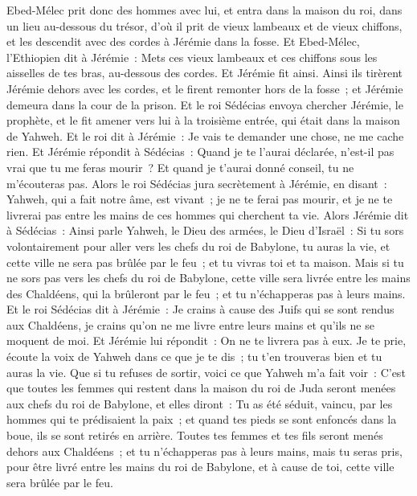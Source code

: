 \begin{multicols}{2}
Ebed-Mélec prit donc des hommes avec lui, et entra dans la maison du roi, dans un lieu au-dessous du trésor, d'où il prit de vieux lambeaux et de vieux chiffons, et les descendit avec des cordes à Jérémie dans la fosse.
Et Ebed-Mélec, l'Ethiopien dit à Jérémie~: Mets ces vieux lambeaux et ces chiffons sous les aisselles de tes bras, au-dessous des cordes. Et Jérémie fit ainsi.
Ainsi ils tirèrent Jérémie dehors avec les cordes, et le firent remonter hors de la fosse~; et Jérémie demeura dans la cour de la prison.
Et le roi Sédécias envoya chercher Jérémie, le prophète, et le fit amener vers lui à la troisième entrée, qui était dans la maison de Yahweh. Et le roi dit à Jérémie~: Je vais te demander une chose, ne me cache rien.
Et Jérémie répondit à Sédécias~: Quand je te l'aurai déclarée, n'est-il pas vrai que tu me feras mourir~? Et quand je t'aurai donné conseil, tu ne m'écouteras pas.
Alors le roi Sédécias jura secrètement à Jérémie, en disant~: Yahweh, qui a fait notre âme, est vivant~; je ne te ferai pas mourir, et je ne te livrerai pas entre les mains de ces hommes qui cherchent ta vie.
Alors Jérémie dit à Sédécias~: Ainsi parle Yahweh, le Dieu des armées, le Dieu d'Israël~: Si tu sors volontairement pour aller vers les chefs du roi de Babylone, tu auras la vie, et cette ville ne sera pas brûlée par le feu~; et tu vivras toi et ta maison.
Mais si tu ne sors pas vers les chefs du roi de Babylone, cette ville sera livrée entre les mains des Chaldéens, qui la brûleront par le feu~; et tu n'échapperas pas à leurs mains.
Et le roi Sédécias dit à Jérémie~: Je crains à cause des Juifs qui se sont rendus aux Chaldéens, je crains qu'on ne me livre entre leurs mains et qu'ils ne se moquent de moi.
Et Jérémie lui répondit~: On ne te livrera pas à eux. Je te prie, écoute la voix de Yahweh dans ce que je te dis~; tu t'en trouveras bien et tu auras la vie.
Que si tu refuses de sortir, voici ce que Yahweh m'a fait voir~:
C'est que toutes les femmes qui restent dans la maison du roi de Juda seront menées aux chefs du roi de Babylone, et elles diront~: Tu as été séduit, vaincu, par les hommes qui te prédisaient la paix~; et quand tes pieds se sont enfoncés dans la boue, ils se sont retirés en arrière.
Toutes tes femmes et tes fils seront menés dehors aux Chaldéens~; et tu n'échapperas pas à leurs mains, mais tu seras pris, pour être livré entre les mains du roi de Babylone, et à cause de toi, cette ville sera brûlée par le feu.

\end{multicols}
